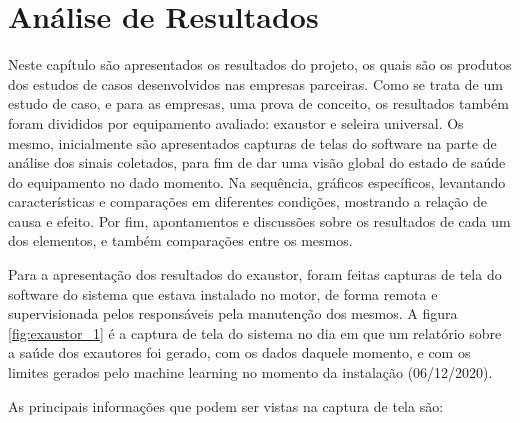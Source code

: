 
\chapter{Análise de Resultados}

Neste capítulo são apresentados os resultados do projeto, os quais são os produtos dos estudos de casos desenvolvidos nas empresas parceiras.
Como se trata de um estudo de caso, e para as empresas, uma prova de conceito, os resultados também foram divididos por equipamento avaliado:
exaustor e seleira universal. Os mesmo, inicialmente são apresentados capturas de telas do software na parte de análise dos sinais coletados, para fim
de dar uma visão global do estado de saúde do equipamento no dado momento. Na sequência, gráficos específicos, levantando características e 
comparações em diferentes condições, mostrando a relação de causa e efeito. Por fim, apontamentos e discussões sobre os resultados de cada um
dos elementos, e também comparações entre os mesmos.

Para a apresentação dos resultados do exaustor, foram feitas capturas de tela do software do sistema que estava instalado no motor, de forma
remota e supervisionada pelos responsáveis pela manutenção dos mesmos. A figura \ref{fig:exaustor_1} é a captura de tela do sistema no dia
em que um relatório sobre a saúde dos exautores foi gerado, com os dados daquele momento, e com os limites gerados pelo machine learning
no momento da instalação (06/12/2020).

As principais informações que podem ser vistas na captura de tela são: 


